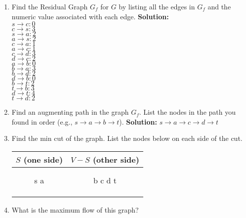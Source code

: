 \documentclass[10pt]{article}
\newcommand{\solution}[1]{\color{blue}\hfill\break\noindent\textbf{Solution:} #1\color{black}}
\begin{document}
\begin{enumerate}
    \item Find the Residual Graph $G_f$ for $G$ by listing all the edges in $G_f$ and the numeric value associated with each edge.
    \solution{\\
    $s\rightarrow c: 0$\\
    $c\rightarrow s: 3$\\
    $s\rightarrow a: 2$\\ 
    $a\rightarrow s: 2$\\
    $c\rightarrow a: 1$\\ 
    $a\rightarrow c: 1$\\
    $c\rightarrow d: 3$\\ 
    $d\rightarrow c: 2$\\
    $a\rightarrow b: 0$\\ 
    $b\rightarrow a: 3$\\
    $b\rightarrow d: 2$\\ 
    $d\rightarrow b: 0$\\
    $b\rightarrow t: 2$\\ 
    $t\rightarrow b: 3$\\
    $d\rightarrow t: 4$\\
    $t\rightarrow d: 2$
    }

    \item Find an augmenting path in the graph $G_f$.  List the nodes in the path you found in order (e.g., $s \rightarrow a \rightarrow b \rightarrow t$).
    \solution{
    $s \rightarrow a \rightarrow c \rightarrow d \rightarrow t$
    }
    
    
    \item Find the min cut of the graph.  List the nodes below on each side of the cut.
\begin{center}
\begin{tabular}{|c|c|}
     \hline
    \textbf{$S$ (one side)} & \textbf{$V-S$ (other side)}\\
     \hline \hline
     \hspace{2.5in} & \hspace{2.5in} \\
      & \\s a & b c d t
      & \\
      & \\
      & \\
      & \\
     \hline
\end{tabular}
\end{center}

\item What is the maximum flow of this graph?
\end{enumerate}
\end{document}
